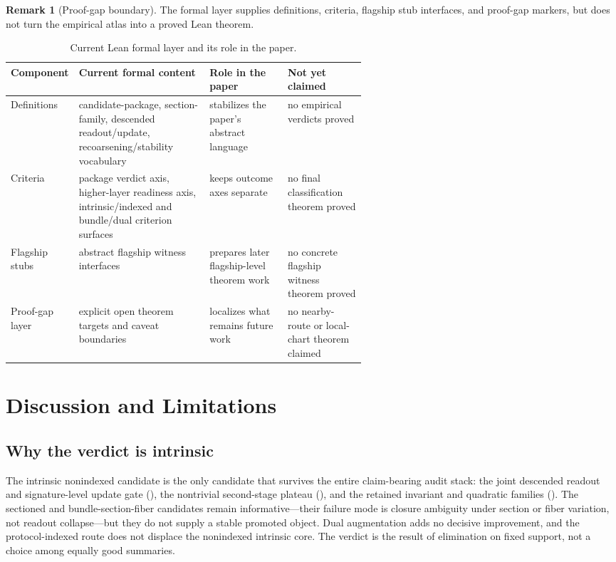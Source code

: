 \documentclass[11pt]{article}
\theoremstyle{definition}
\newtheorem{remark}[theorem]{Remark}
\begin{document}
\begin{remark}[Proof-gap boundary]
\label{rem:formal-proof-gap}
The formal layer supplies definitions, criteria, flagship stub interfaces, and proof-gap markers, but does not turn the empirical atlas into a proved Lean theorem.
\end{remark}

\begin{table}[t]
\centering
\small
\begin{tabularx}{\linewidth}{@{}>{\raggedright\arraybackslash}p{0.14\linewidth}>{\raggedright\arraybackslash}X>{\raggedright\arraybackslash}p{0.22\linewidth}>{\raggedright\arraybackslash}p{0.22\linewidth}@{}}
\toprule
Component & Current formal content & Role in the paper & Not yet claimed \\
\midrule
Definitions & candidate-package, section-family, descended readout/update, recoarsening/stability vocabulary & stabilizes the paper's abstract language & no empirical verdicts proved \\
Criteria & package verdict axis, higher-layer readiness axis, intrinsic/indexed and bundle/dual criterion surfaces & keeps outcome axes separate & no final classification theorem proved \\
Flagship stubs & abstract flagship witness interfaces & prepares later flagship-level theorem work & no concrete flagship witness theorem proved \\
Proof-gap layer & explicit open theorem targets and caveat boundaries & localizes what remains future work & no nearby-route or local-chart theorem claimed \\
\bottomrule
\end{tabularx}
\caption{Current Lean formal layer and its role in the paper.}
\label{tab:formal-layer}
\end{table}
 \section{Discussion and Limitations}

\subsection{Why the verdict is intrinsic}

The intrinsic nonindexed candidate is the only candidate that survives the entire claim-bearing audit stack: the joint descended readout and signature-level update gate (), the nontrivial second-stage plateau (), and the retained invariant and quadratic families (). The sectioned and bundle-section-fiber candidates remain informative---their failure mode is closure ambiguity under section or fiber variation, not readout collapse---but they do not supply a stable promoted object. Dual augmentation adds no decisive improvement, and the protocol-indexed route does not displace the nonindexed intrinsic core. The verdict is the result of elimination on fixed support, not a choice among equally good summaries.
\end{document}
